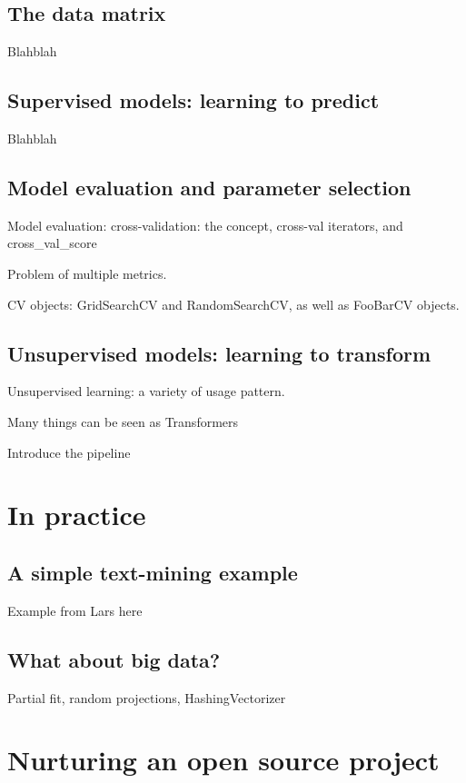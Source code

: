 \documentclass{article}
\begin{document}
\subsection{The data matrix}

Blahblah

\subsection{Supervised models: learning to predict}

Blahblah

\subsection{Model evaluation and parameter selection}

Model evaluation:
cross-validation: the concept, cross-val iterators, and cross\_val\_score

Problem of multiple metrics.

CV objects: GridSearchCV and RandomSearchCV, as well as FooBarCV objects.

\subsection{Unsupervised models: learning to transform}

Unsupervised learning: a variety of usage pattern.

Many things can be seen as Transformers

Introduce the pipeline

\section{In practice}

\subsection{A simple text-mining example}

Example from Lars here

\subsection{What about big data?}

Partial fit, random projections, HashingVectorizer

\section{Nurturing an open source project}
\end{document}
